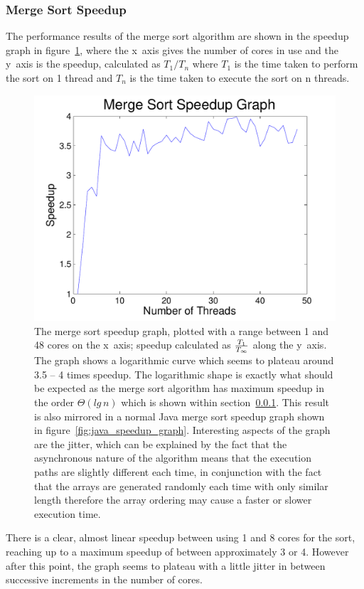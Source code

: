 \documentclass[12pt,twoside,notitlepage]{report}
\begin{document}
\subsubsection{Merge Sort Speedup}
\label{subsec:merge_sort_performance_analysis}
The performance results of the merge sort algorithm are shown in the speedup graph in figure~\ref{fig:msort_speedup_graph}, where the x~axis gives the number of cores in use and the y~axis is the speedup, calculated as
$T_1 / T_n$ where $T_1$ is the time taken to perform the sort on 1 thread and $T_n$ is the time taken to execute the sort on n threads.
\begin{figure}[h!]
\includegraphics[width=\linewidth]{msort_speedup_graph}
\caption[Parallel Merge Sort Speedup Graph]{The merge sort speedup graph, plotted with a range between 1 and 48 cores on the x~axis; speedup calculated as $T_{1} \over T_{\infty}$ along the y~axis. The graph shows a logarithmic curve which seems to plateau around 3.5
-- 4 times speedup. The logarithmic shape is exactly what should be expected as the merge sort algorithm has maximum speedup in the order $\Theta(lg\,n)$ which is shown within section~\ref{subsec:merge_sort_performance_analysis}.
This result is also mirrored in a normal Java merge sort speedup graph shown in figure~\ref{fig:java_speedup_graph}. Interesting aspects of the graph are the jitter, which can be explained by the fact that the asynchronous nature of
the algorithm means that the execution paths are slightly different each time, in conjunction with the fact that the arrays are generated randomly each time with only similar length therefore the array ordering may cause a faster or
slower execution time.}
\label{fig:msort_speedup_graph}
\end{figure}
There is a clear, almost linear speedup between using 1 and 8 cores for the sort, reaching up to a maximum speedup of between approximately 3 or 4. However after this point, the graph seems to plateau with a little jitter in between
successive increments in the number of cores.
\end{document}
